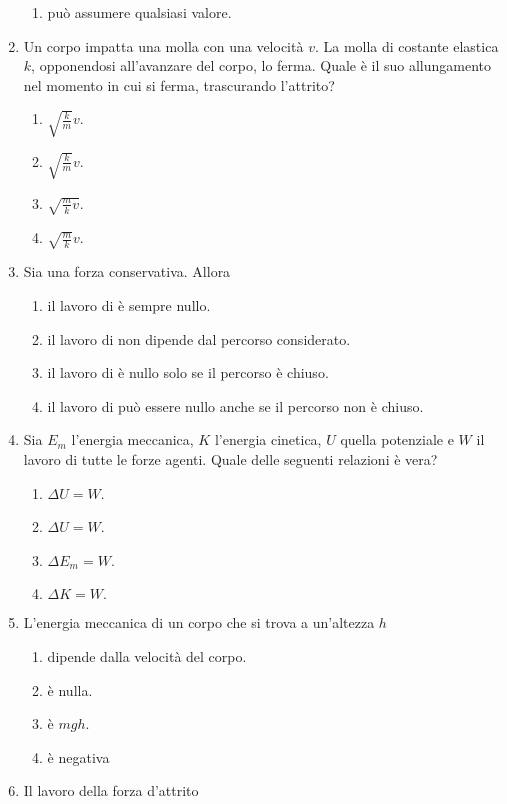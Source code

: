 \documentclass{article}
\begin{document}
\begin{enumerate}
\begin{enumerate}[label=\Alph*.]
    \item può assumere qualsiasi valore.
  \end{enumerate}
  \item Un corpo impatta una molla con una velocità $v$. La molla di costante elastica $k$, opponendosi all'avanzare del corpo, lo ferma. Quale è il suo allungamento nel momento in cui si ferma, trascurando l'attrito?
  \begin{enumerate}[label=\Alph*.]
    \item $\sqrt{\frac{k}{m}}v$.
    \item $\sqrt{\frac{k}{m}}v$.
    \item $\sqrt{\frac{m}{k}v}$.
    \item $\sqrt{\frac{m}{k}}v$.
  \end{enumerate}
  \item Sia  una forza conservativa. Allora
  \begin{enumerate}[label=\Alph*.]
    \item il lavoro di  è sempre nullo.
    \item il lavoro di  non dipende dal percorso considerato.
    \item il lavoro di  è nullo solo se il percorso è chiuso.
    \item il lavoro di  può essere nullo anche se il percorso non è chiuso.
  \end{enumerate}
  \item Sia $E_m$ l'energia meccanica, $K$ l'energia cinetica, $U$ quella potenziale e $W$ il lavoro di tutte le forze agenti. Quale delle seguenti relazioni è vera?
  \begin{enumerate}[label=\Alph*.]
    \item $\Delta U=W$.
    \item $\Delta U=W$.
    \item $\Delta E_m=W$.
    \item $\Delta K=W.$
  \end{enumerate}
  \item L'energia meccanica di un corpo che si trova a un'altezza $h$
  \begin{enumerate}[label=\Alph*.]
    \item dipende dalla velocità del corpo.
    \item è nulla.
    \item è $mgh$.
    \item è negativa
  \end{enumerate}
  \item Il lavoro della forza d'attrito

\end{enumerate}
\end{document}
